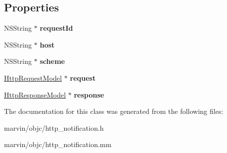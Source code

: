 \subsection*{Properties}
\begin{DoxyCompactItemize}
\item 
\mbox{\label{interface_http_notification_a43218997491261c7346634cff04722cc}} 
N\+S\+String $\ast$ {\bfseries request\+Id}
\item 
\mbox{\label{interface_http_notification_a46b15249aea6cbfc738d9e710d75a115}} 
N\+S\+String $\ast$ {\bfseries host}
\item 
\mbox{\label{interface_http_notification_ab13994fda2459c0e7c1921897e0e6eca}} 
N\+S\+String $\ast$ {\bfseries scheme}
\item 
\mbox{\label{interface_http_notification_a8d1cd130ec125944e62267419b2d3fe7}} 
\hyperlink{interface_http_request_model}{Http\+Request\+Model} $\ast$ {\bfseries request}
\item 
\mbox{\label{interface_http_notification_affc5114b35502c34dc92b9a21308eb33}} 
\hyperlink{interface_http_response_model}{Http\+Response\+Model} $\ast$ {\bfseries response}
\end{DoxyCompactItemize}


The documentation for this class was generated from the following files\+:\begin{DoxyCompactItemize}
\item 
marvin/objc/http\+\_\+notification.\+h\item 
marvin/objc/http\+\_\+notification.\+mm\end{DoxyCompactItemize}
